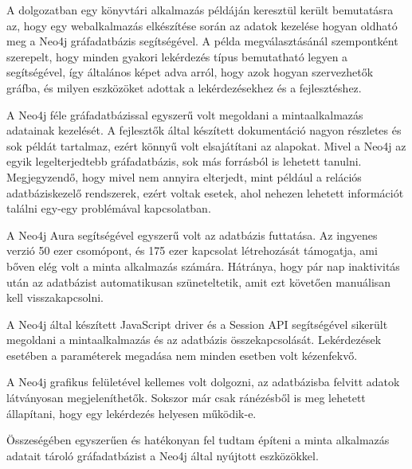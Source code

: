 


A dolgozatban egy könyvtári alkalmazás példáján keresztül került bemutatásra az, hogy egy webalkalmazás elkészítése során az adatok kezelése hogyan oldható meg a Neo4j gráfadatbázis segítségével.
A példa megválasztásánál szempontként szerepelt, hogy minden gyakori lekérdezés típus bemutatható legyen a segítségével, így általános képet adva arról, hogy azok hogyan szervezhetők gráfba, és milyen eszközöket adottak a lekérdezésekhez és a fejlesztéshez.

A Neo4j féle gráfadatbázissal egyszerű volt megoldani a mintaalkalmazás adatainak kezelését. A fejlesztők által készített dokumentáció nagyon részletes és sok példát tartalmaz, ezért könnyű volt elsajátítani az alapokat. Mivel a Neo4j az egyik legelterjedtebb gráfadatbázis, sok más forrásból is lehetett tanulni. Megjegyzendő, hogy mivel nem annyira elterjedt, mint például a relációs adatbáziskezelő rendszerek, ezért voltak esetek, ahol nehezen lehetett információt találni egy-egy problémával kapcsolatban. 

A Neo4j Aura segítségével egyszerű volt az adatbázis futtatása. Az ingyenes verzió 50 ezer csomópont, és 175 ezer kapcsolat létrehozását támogatja, ami bőven elég volt a minta alkalmazás számára. Hátránya, hogy pár nap inaktivitás után az adatbázist automatikusan szüneteltetik, amit ezt követően manuálisan kell visszakapcsolni.

A Neo4j által készített JavaScript driver és a Session API segítségével sikerült megoldani a mintaalkalmazás és az adatbázis összekapcsolását. Lekérdezések esetében a paraméterek megadása nem minden esetben volt kézenfekvő.

A Neo4j grafikus felületével kellemes volt dolgozni, az adatbázisba felvitt adatok látványosan megjeleníthetők. Sokszor már csak ránézésből is meg lehetett állapítani, hogy egy lekérdezés helyesen működik-e.

Összeségében egyszerűen és hatékonyan fel tudtam építeni a minta alkalmazás adatait tároló gráfadatbázist a Neo4j által nyújtott eszközökkel.
